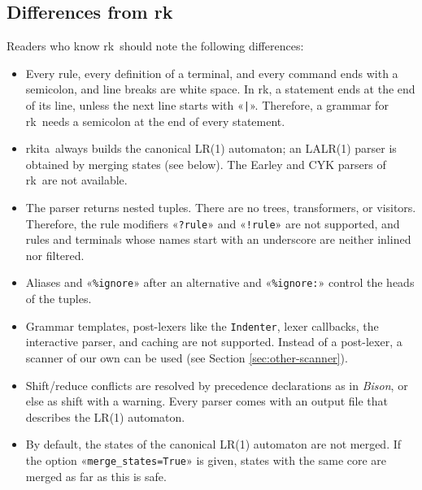 \documentclass[11pt,a4paper]{article}
\makeatletter
\newcommand{\fakesc}[1]{\resizebox{!}{0.99ex}{\textls[90]{\MakeUppercase{#1}}}}
\def\@simtextsc#1#2\@nil{\MakeUppercase{#1}\fakesc{#2}}
\newcommand{\simtextsc}[1]{%
  \ifmmode\text{\@simtextsc#1\@nil}\else\@simtextsc#1\@nil\fi}
\newcommand{\Larkita}{\simtextsc{Larkita}}
\newcommand{\Lark}{\simtextsc{Lark}}
\makeatother
\begin{document}
\subsection{Differences from \Lark}
Readers who know \Lark\ should note the following differences:
\begin{itemize}
\item Every rule, every definition of a terminal, and every command ends with a semicolon, and line breaks
      are white space.  In \Lark, a statement ends at the end of its line, unless the next line starts with
      «\verb+|+».  Therefore, a grammar for \Lark\ needs a semicolon at the end of every statement.
\item \Larkita\ always builds the canonical LR(1) automaton; an LALR(1) parser is obtained by merging states
      (see below).  The Earley and CYK parsers of \Lark\ are not available.
\item The parser returns nested tuples.  There are no trees, transformers, or visitors.  Therefore, the rule
      modifiers «\verb|?rule|» and «\verb|!rule|» are not supported, and rules and terminals whose names start
      with an underscore are neither inlined nor filtered.
\item Aliases and «\verb|%ignore|» after an alternative and «\verb|%ignore:|» control the heads of the tuples.
\item Grammar templates, post-lexers like the \texttt{Indenter}, lexer callbacks, the interactive parser,
      and caching are not supported.  Instead of a post-lexer, a scanner of our own can be used (see
      Section \ref{sec:other-scanner}).
\item Shift/reduce conflicts are resolved by precedence declarations as in \textsl{Bison}, or else as shift
      with a warning.  Every parser comes with an output file that describes the LR(1) automaton.
\item By default, the states of the canonical LR(1) automaton are not merged.  If the option
      «\verb|merge_states=True|» is given, states with the same core are merged as far as this is safe.
\end{itemize}
\end{document}
